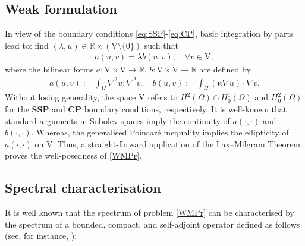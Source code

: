 \documentclass[final,reqno]{elsarticle}
\def\bkappa{\boldsymbol{\kappa}}
\def\rV{\mathrm{V}}
\begin{document}
\subsection{Weak formulation}
In view of the boundary conditions \eqref{eq:SSP}-\eqref{eq:CP}, basic integration by parts lead to: find $(\lambda,u)\in \mathbb{R}\times (\rV\setminus \{0\})$ such that
\begin{align}\label{WMPr}
    a(u,v) = \lambda b(u,v), \quad \forall v\in \rV ,
\end{align}
where the bilinear forms $a: \rV\times \rV  \to \mathbb{R}$, $b:\rV\times \rV\to \mathbb{R}$ are defined by 
\begin{align*}
     a(u,v):=\int_{\Omega}\nabla^2 u: \nabla^2 v, \quad b(u,v):=\int_{\Omega}(\bkappa\nabla u)\cdot \nabla v.
\end{align*}
Without losing generality, the space $\rV$ refers to $H^2(\Omega)\cap H_0^1(\Omega)$ and $H_0^2(\Omega)$ for the \textbf{SSP} and \textbf{CP} boundary conditions, respectively. It is well-known that standard arguments in Sobolev spaces imply the continuity of $a(\cdot,\cdot)$ and $b(\cdot,\cdot)$. Whereas, the generalised Poincar\'e inequality implies the ellipticity of $a(\cdot,\cdot)$ on  $\rV$. Thus, a straight-forward application of the Lax–Milgram Theorem proves the well-posedness of \eqref{WMPr}.
\subsection{Spectral characterisation}
It is well known that the spectrum of problem \eqref{WMPr} can be characterised by the spectrum of a bounded, compact, and self-adjoint operator defined as follows (see, for instance, \cite{ciarlet}):
\end{document}

